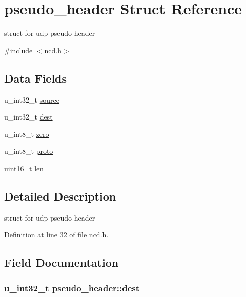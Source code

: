 \hypertarget{structpseudo__header}{\section{pseudo\-\_\-header Struct Reference}
\label{structpseudo__header}
}


struct for udp pseudo header  




{\ttfamily \#include $<$ncd.\-h$>$}

\subsection*{Data Fields}
\begin{DoxyCompactItemize}
\item 
u\-\_\-int32\-\_\-t \hyperlink{structpseudo__header_ac1d63e2b666037057fba16b852c83549}{source}
\item 
u\-\_\-int32\-\_\-t \hyperlink{structpseudo__header_a825382766bd224e1ab209d7e1248efa8}{dest}
\item 
u\-\_\-int8\-\_\-t \hyperlink{structpseudo__header_a2a93c892eaf942dfb5c28a69c88f0ad7}{zero}
\item 
u\-\_\-int8\-\_\-t \hyperlink{structpseudo__header_acdb79cab7f361df75fe519e43e1db18c}{proto}
\item 
uint16\-\_\-t \hyperlink{structpseudo__header_a436e199ba010989dff88ba26ee6de668}{len}
\end{DoxyCompactItemize}


\subsection{Detailed Description}
struct for udp pseudo header 

Definition at line 32 of file ncd.\-h.



\subsection{Field Documentation}
\hypertarget{structpseudo__header_a825382766bd224e1ab209d7e1248efa8}{
\subsubsection[{dest}]{\setlength{\rightskip}{0pt plus 5cm}u\-\_\-int32\-\_\-t pseudo\-\_\-header\-::dest}}\label{structpseudo__header_a825382766bd224e1ab209d7e1248efa8}



